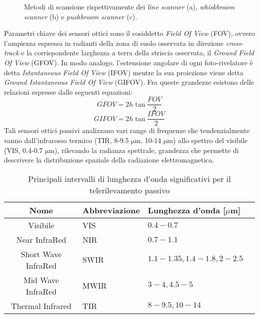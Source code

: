 \begin{figure}[htbp]
\centering
{}
\qquad
{}
\qquad
{}
\qquad
\caption{Metodi di scansione rispettivamente dei \emph{line scanner} (a), \emph{whiskbroom scanner} (b) e \emph{pushbroom scanner} (c).}
\end{figure}

Parametri chiave dei sensori ottici sono il cosiddetto \emph{Field Of View} (FOV), ovvero l'ampiezza espressa in radianti della zona di suolo osservata in direzione \emph{cross-track} e la corrispondente larghezza a terra della striscia osservata, il \emph{Ground Field Of View} (GFOV).
In modo analogo, l'estensione angolare di ogni foto-rivelatore è detta \emph{Istantaneous Field Of View} (IFOV) mentre la sua proiezione viene detta \emph{Ground Istantaneous Field Of View} (GIFOV).
Fra queste grandezze esistono delle relazioni espresse dalle seguenti equazioni:
\begin{equation}
GFOV = 2h\tan{\frac{FOV}{2}} 
\end{equation}
\begin{equation}
GIFOV = 2h\tan{\frac{IFOV}{2}}
\end{equation}
Tali sensori ottici passivi analizzano vari range di frequenze che tendenzialmente vanno dall'infrarosso termico (TIR, 8-9.5 $\si{\micro\m}$, 10-14 $\si{\micro\m}$) allo spettro del visibile (VIS, 0.4-0.7 $\si{\micro\m}$), rilevando la radianza spettrale, grandezza che permette di descrivere la distribuzione spaziale della radiazione elettromagnetica. 

\begin{table}
\caption{Principali intervalli di lunghezza d'onda significativi per il telerilevamento passivo}
\center
\begin{tabular}{cp{3cm}p{5cm}p{5cm}}
Nome							&Abbreviazione	&Lunghezza d'onda [$\mu$m]\\ \hline
Visibile							&VIS						&$0.4-0.7$\\ 
Near InfraRed				&NIR						&$0.7-1.1$\\
Short Wave InfraRed	&SWIR					&$1.1-1.35, 1.4-1.8, 2-2.5$\\
Mid Wave InfraRed		&MWIR					&$3-4, 4.5-5$\\
Thermal Infrared			&TIR						&$8-9.5, 10-14$\\
\end{tabular}
\end{table}

